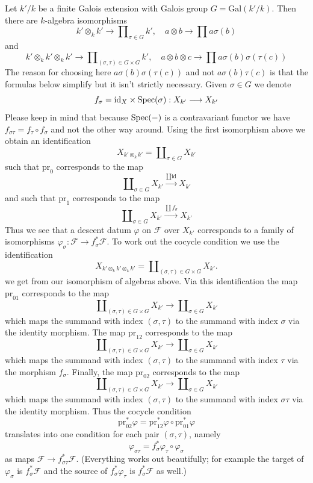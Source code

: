 \medskip\noindent
Let $k'/k$ be a finite Galois extension with Galois group
$G = \text{Gal}(k'/k)$. Then there are $k$-algebra isomorphisms
$$
k' \otimes_k k' \longrightarrow \prod\nolimits_{\sigma \in G} k',\quad
a \otimes b \longrightarrow \prod a\sigma(b)
$$
and
$$
k' \otimes_k k' \otimes_k k' \longrightarrow
\prod\nolimits_{(\sigma, \tau) \in G \times G} k',\quad
a \otimes b \otimes c \longrightarrow \prod a\sigma(b)\sigma(\tau(c))
$$
The reason for choosing here $a\sigma(b)\sigma(\tau(c))$
and not $a\sigma(b)\tau(c)$ is that the formulas below simplify but
it isn't strictly necessary. Given $\sigma \in G$ we denote
$$
f_\sigma = \text{id}_X \times \mathop{\mathrm{Spec}}(\sigma) :
X_{k'} \longrightarrow X_{k'}
$$
Please keep in mind that because $\mathop{\mathrm{Spec}}(-)$ is a contravariant functor we have
$f_{\sigma \tau} = f_\tau \circ f_\sigma$ and not the other way around.
Using the first isomorphism above we obtain an identification
$$
X_{k' \otimes_k k'} = \coprod\nolimits_{\sigma \in G} X_{k'}
$$
such that $\text{pr}_0$ corresponds to the map
$$
\coprod\nolimits_{\sigma \in G} X_{k'}
\xrightarrow{\coprod \text{id}}
X_{k'}
$$
and such that $\text{pr}_1$ corresponds to the map
$$
\coprod\nolimits_{\sigma \in G} X_{k'}
\xrightarrow{\coprod f_\sigma}
X_{k'}
$$
Thus we see that a descent datum $\varphi$ on $\mathcal{F}$ over $X_{k'}$
corresponds to a family of isomorphisms
$\varphi_\sigma : \mathcal{F} \to f_\sigma^*\mathcal{F}$.
To work out the cocycle condition we use the identification
$$
X_{k' \otimes_k k' \otimes_k k'} =
\coprod\nolimits_{(\sigma, \tau) \in G \times G} X_{k'}.
$$
we get from our isomorphism of algebras above.
Via this identification the map $\text{pr}_{01}$ corresponds to
the map
$$
\coprod\nolimits_{(\sigma, \tau) \in G \times G} X_{k'}
\longrightarrow
\coprod\nolimits_{\sigma \in G} X_{k'}
$$
which maps the summand with index $(\sigma, \tau)$ to the summand
with index $\sigma$ via the identity morphism. The map $\text{pr}_{12}$
corresponds to the map
$$
\coprod\nolimits_{(\sigma, \tau) \in G \times G} X_{k'}
\longrightarrow
\coprod\nolimits_{\sigma \in G} X_{k'}
$$
which maps the summand with index $(\sigma, \tau)$ to the summand
with index $\tau$ via the morphism $f_\sigma$. Finally, the map
$\text{pr}_{02}$ corresponds to the map
$$
\coprod\nolimits_{(\sigma, \tau) \in G \times G} X_{k'}
\longrightarrow
\coprod\nolimits_{\sigma \in G} X_{k'}
$$
which maps the summand with index $(\sigma, \tau)$ to the summand
with index $\sigma\tau$ via the identity morphism.
Thus the cocycle condition
$$
\text{pr}_{02}^*\varphi = \text{pr}_{12}^*\varphi \circ \text{pr}_{01}^*\varphi
$$
translates into one condition for each pair $(\sigma, \tau)$, namely
$$
\varphi_{\sigma\tau} = f_\sigma^*\varphi_\tau \circ \varphi_\sigma
$$
as maps $\mathcal{F} \to f_{\sigma\tau}^*\mathcal{F}$.
(Everything works out beautifully; for example the target of
$\varphi_\sigma$ is $f_\sigma^*\mathcal{F}$ and the
source of $f_\sigma^*\varphi_\tau$ is $f_\sigma^*\mathcal{F}$ as well.)


